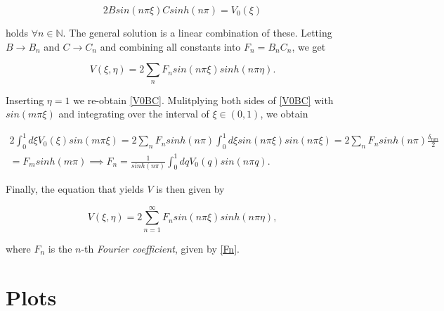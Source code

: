 \documentclass[11p, a4paper, english]{article}
\begin{document}
\begin{equation}
2Bsin(n\pi\xi)Csinh(n\pi) = V_{0}(\xi)
\label{V0BC}
\end{equation}

holds $\forall n \in \mathbb{N}$. The general solution is a linear combination of these. Letting $B \rightarrow B_{n}$ and $C \rightarrow C_{n}$ and combining all constants into $F_{n} = B_{n}C_{n}$, we get

\begin{equation}
V(\xi, \eta) = 2\sum_{n}F_{n}sin(n\pi\xi)sinh(n\pi\eta).
\label{Vtemp}
\end{equation}

Inserting $\eta = 1$ we re-obtain \cref{V0BC}. Mulitplying both sides of \cref{V0BC} with $sin(m\pi\xi)$ and integrating over the interval of $\xi \in (0,1)$, we obtain

\begin{align}
2\int_{0}^{1}d\xi V_{0}(\xi)sin(m\pi\xi) = 2\sum_{n}F_{n}sinh(n\pi)\int_{0}^{1}d\xi sin(n\pi\xi)sin(n\pi\xi) = 2\sum_{n}F_{n}sinh(n\pi)\frac{\delta_{nm}}{2}	\\ 
= F_{m}sinh(m\pi) \implies F_{n} = \frac{1}{sinh(n\pi)}\int_{0}^{1}dqV_{0}(q)sin(n\pi q).
\label{Fn}
\end{align}

Finally, the equation that yields $V$ is then given by

\begin{equation}
V(\xi, \eta) = 2\sum_{n=1}^{\infty}F_{n}sin(n\pi\xi)sinh(n\pi\eta),
\label{V}
\end{equation}

where $F_{n}$ is the $n$-th \textit{Fourier coefficient}, given by \cref{Fn}.


\section{Plots}
\end{document}
